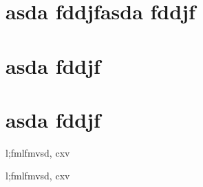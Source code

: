 \section{asda fddjfasda fddjf }
\label{fredd}



\section{asda fddjf }
\label{fredd}

\section{asda fddjf }
\label{fredd}















l;fmlfmvsd,  cxv

l;fmlfmvsd,  cxv





